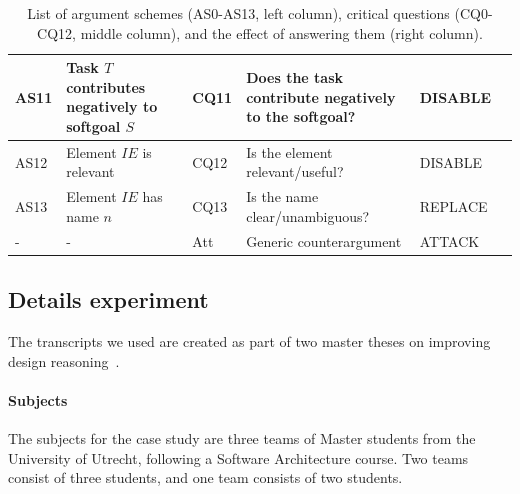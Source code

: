 \begin{table}[h]
\begin{tabularx}{\textwidth}{|l|l|l|X|l|l|}
AS11 & Task $T$ contributes negatively to softgoal $S$& CQ11 & Does the task contribute negatively to the softgoal?& DISABLE\\
\hline
\hline
AS12 & Element $IE$ is relevant & CQ12 & Is the element relevant/useful? & DISABLE\\
\hline
AS13 & Element $IE$ has name $n$ & CQ13 & Is the name clear/unambiguous? & REPLACE\\
\hline
\hline
- & - & Att & Generic counterargument & ATTACK\\
\hline
\end{tabularx}
\caption{List of argument schemes (AS0-AS13, left column), critical questions (CQ0-CQ12, middle column), and the effect of answering them (right column).}
\label{table:argument-schemes}
\end{table}

\subsection{Details experiment}

The transcripts we used are created as part of two master theses on improving design reasoning~\cite{masterthesis1,masterthesis2}.

\paragraph{Subjects} The subjects for the case study are three teams of Master students from the University of Utrecht, following a Software Architecture course. Two teams consist of three students, and one team consists of two students.


